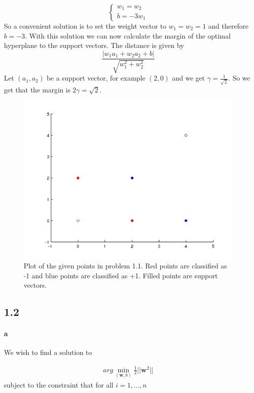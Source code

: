 \documentclass{article}
\begin{document}
\[
\begin{cases}
w_1 = w_2\\
b = -3w_1
\end{cases}
\]
So a convenient solution is to set the weight vector to $w_1 = w_2 = 1$ and therefore $b=-3$.
With this solution we can now calculate the margin of the optimal hyperplane to the support vectors.
The distance is given by
\[
  \frac{|w_1a_1+w_2a_2+b |}{\sqrt{w_1^2+w_2^2}}
\]
Let $(a_1,a_2)$ be a support vector, for example $(2,0)$ and we get $\gamma = \frac{1}{\sqrt2}$.
So we get that the margin is $2\gamma = \sqrt2$.
\begin{figure}
\includegraphics[scale=0.6]{pics/plot11.png}
\caption{Plot of the given points in problem 1.1.
  Red points are classified as -1 and blue points are classified as +1.
Filled points are support vectors.}
\end{figure}

\subsection*{1.2}
\paragraph{a}

We wish to find a solution to

\begin{align}
  arg \min_{(\mathbf{w}, b)} \frac{1}{2} \lvert \rvert \mathbf{w}^2 \lvert \rvert
\end{align}
subject to the constraint that for all $i = 1, ... , n$
\end{document}
